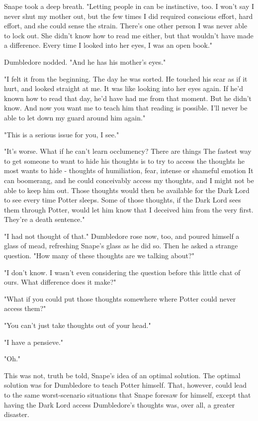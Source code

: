 Snape took a deep breath. "Letting people in can be instinctive, too. I won't say I never shut my mother out, but the few times I did required conscious effort, hard effort, and she could sense the strain. There's one other person I was never able to lock out. She didn't know how to read me either, but that wouldn't have made a difference. Every time I looked into her eyes, I was an open book."

Dumbledore nodded. "And he has his mother's eyes."

"I felt it from the beginning. The day he was sorted. He touched his scar as if it hurt, and looked straight at me. It was like looking into her eyes again. If he'd known how to read that day, he'd have had me from that moment. But he didn't know. And now you want me to teach him that reading is possible. I'll never be able to let down my guard around him again."

"This is a serious issue for you, I see."

"It's worse. What if he can't learn occlumency? There are things{\el} The fastest way to get someone to want to hide his thoughts is to try to access the thoughts he most wants to hide - thoughts of humiliation, fear, intense or shameful emotion{\el} It can boomerang, and he could conceivably access my thoughts, and I might not be able to keep him out. Those thoughts would then be available for the Dark Lord to see every time Potter sleeps. Some of those thoughts, if the Dark Lord sees them through Potter, would let him know that I deceived him from the very first. They're a death sentence."

"I had not thought of that." Dumbledore rose now, too, and poured himself a glass of mead, refreshing Snape's glass as he did so. Then he asked a strange question. "How many of these thoughts are we talking about?"

"I don't know. I wasn't even considering the question before this little chat of ours. What difference does it make?"

"What if you could put those thoughts somewhere where Potter could never access them?"

"You can't just take thoughts out of your head."

"I have a pensieve."

"Oh."

This was not, truth be told, Snape's idea of an optimal solution. The optimal solution was for Dumbledore to teach Potter himself. That, however, could lead to the same worst-scenario situations that Snape foresaw for himself, except that having the Dark Lord access Dumbledore's thoughts was, over all, a greater disaster.

